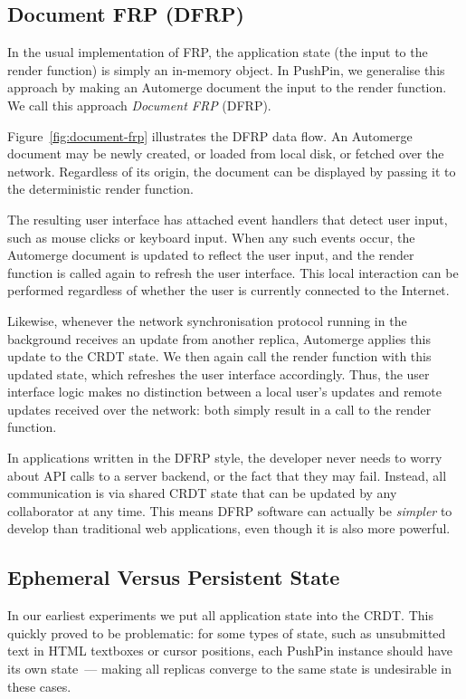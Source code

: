 \documentclass[sigplan,10pt]{acmart}
\begin{document}
\subsection{Document FRP (DFRP)}

In the usual implementation of FRP, the application state (the input to the render function) is simply an in-memory object.
In PushPin, we generalise this approach by making an Automerge document the input to the render function.
We call this approach \emph{Document FRP} (DFRP).

Figure~\ref{fig:document-frp} illustrates the DFRP data flow.
An Automerge document may be newly created, or loaded from local disk, or fetched over the network.
Regardless of its origin, the document can be displayed by passing it to the deterministic render function.

The resulting user interface has attached event handlers that detect user input, such as mouse clicks or keyboard input.
When any such events occur, the Automerge document is updated to reflect the user input, and the render function is called again to refresh the user interface.
This local interaction can be performed regardless of whether the user is currently connected to the Internet.

Likewise, whenever the network synchronisation protocol running in the background receives an update from another replica, Automerge applies this update to the CRDT state.
We then again call the render function with this updated state, which refreshes the user interface accordingly.
Thus, the user interface logic makes no distinction between a local user's updates and remote updates received over the network: both simply result in a call to the render function.

In applications written in the DFRP style, the developer never needs to worry about API calls to a server backend, or the fact that they may fail.
Instead, all communication is via shared CRDT state that can be updated by any collaborator at any time.
This means DFRP software can actually be \emph{simpler} to develop than traditional web applications, even though it is also more powerful.


\subsection{Ephemeral Versus Persistent State}

In our earliest experiments we put all application state into the CRDT. This quickly proved to be problematic: for some types of state, such as unsubmitted text in HTML textboxes or cursor positions, each PushPin instance should have its own state~--- making all replicas converge to the same state is undesirable in these cases.
\end{document}
